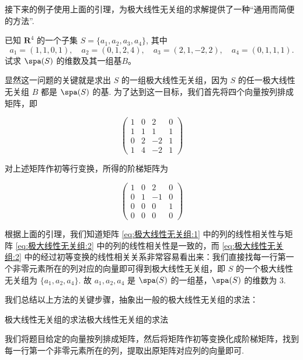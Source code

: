 接下来的例子使用上面的引理，为极大线性无关组的求解提供了一种``通用而简便的方法''.

\begin{example}{}{}
    已知 $\mathbf{R}^4$ 的一个子集 $S = \{a_1, a_2, a_3, a_4\}$, 其中
    \[
        a_1 = (1,1,0,1), \quad a_2 = (0,1,2,4), \quad
        a_3 = (2,1,-2,2), \quad a_4 = (0,1,1,1).
    \]
    试求 $\spa(S)$ 的维数及其一组基$B$。
\end{example}

\begin{solution}

    显然这一问题的关键就是求出 $S$ 的一组极大线性无关组，因为 $S$ 的任一极大线性无关组 $B$ 都是 $\spa(S)$ 的基. 为了达到这一目标，我们首先将四个向量按列排成矩阵，即

    \begin{equation} \label{eq:极大线性无关组:1}
        \begin{pmatrix}
            1 & 0 & 2  & 0 \\
            1 & 1 & 1  & 1 \\
            0 & 2 & -2 & 1 \\
            1 & 4 & -2 & 1
        \end{pmatrix}
    \end{equation}

    对上述矩阵作初等行变换，所得的阶梯矩阵为

    \begin{equation} \label{eq:极大线性无关组:2}
        \begin{pmatrix}
            1 & 0 & 2  & 0 \\
            0 & 1 & -1 & 0 \\
            0 & 0 & 0  & 1 \\
            0 & 0 & 0  & 0
        \end{pmatrix}
    \end{equation}

    根据上面的引理，我们知道矩阵 \eqref{eq:极大线性无关组:1} 中的列的线性相关性与矩阵 \eqref{eq:极大线性无关组:2} 中的列的线性相关性是一致的，而 \eqref{eq:极大线性无关组:2} 中的经过初等变换的线性相关关系非常容易看出来：我们直接找每一行第一个非零元素所在的列对应的向量即可得到极大线性无关组，即 $S$ 的一个极大线性无关组为 $\{a_1, a_2, a_4\}$. 故 $a_1, a_2, a_4$ 是 $\spa(S)$ 的一组基，$\spa(S)$ 的维数为 3.
\end{solution}

我们总结以上方法的关键步骤，抽象出一般的极大线性无关组的求法：
\begin{lemma}{极大线性无关组的求法}{极大线性无关组的求法}

    我们将题目给定的向量按列排成矩阵，然后将矩阵作初等变换化成阶梯矩阵，找到每一行第一个非零元素所在的列，提取出原矩阵对应列的向量即可.
\end{lemma}

